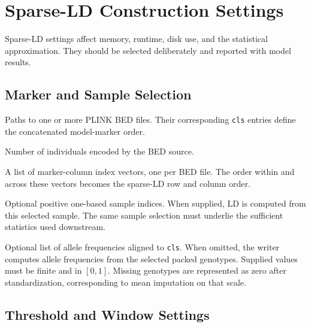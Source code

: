 \documentclass[
  11pt,
  letterpaper,
  DIV=11,
  numbers=noendperiod]{scrartcl}
\providecommand{\tightlist}{%
  \setlength{\itemsep}{0pt}\setlength{\parskip}{0pt}}
\begin{document}
\section{Sparse-LD Construction
Settings}\label{sparse-ld-construction-settings}

Sparse-LD settings affect memory, runtime, disk use, and the statistical
approximation. They should be selected deliberately and reported with
model results.

\subsection{Marker and Sample
Selection}\label{marker-and-sample-selection}

\begin{description}
\tightlist
\item[\texttt{bed\_files}]
Paths to one or more PLINK BED files. Their corresponding \texttt{cls}
entries define the concatenated model-marker order.
\item[\texttt{n}]
Number of individuals encoded by the BED source.
\item[\texttt{cls}]
A list of marker-column index vectors, one per BED file. The order
within and across these vectors becomes the sparse-LD row and column
order.
\item[\texttt{rows}]
Optional positive one-based sample indices. When supplied, LD is
computed from this selected sample. The same sample selection must
underlie the sufficient statistics used downstream.
\item[\texttt{af}]
Optional list of allele frequencies aligned to \texttt{cls}. When
omitted, the writer computes allele frequencies from the selected packed
genotypes. Supplied values must be finite and in \([0,1]\). Missing
genotypes are represented as zero after standardization, corresponding
to mean imputation on that scale.
\end{description}

\subsection{Threshold and Window
Settings}\label{threshold-and-window-settings}
\end{document}
